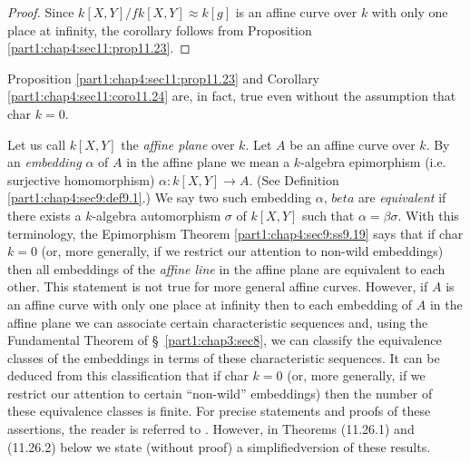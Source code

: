 \begin{proof}
  Since $k[X, Y]/fk [X, Y] \approx k[g]$ is an affine curve over $k$
  with only one place at infinity, the corollary follows from
  Proposition \ref{part1:chap4:sec11:prop11.23}.
\end{proof}

\begin{remark}\label{part1:chap4:sec11:rem11.25}
  Proposition \ref{part1:chap4:sec11:prop11.23} and
  Corollary \ref{part1:chap4:sec11:coro11.24} are, in fact, true even
  without the assumption that char $k=0$.
\end{remark}

\begin{remark}\label{part1:chap4:sec11:rem11.26}
  Let us call $k[X, Y]$ the {\em affine plane} over $k$. Let $A$ be an
  affine curve over $k$. By an {\em embedding} $\alpha$ of $A$ in the
  affine plane we mean a $k$-algebra epimorphism (i.e. surjective
  homomorphism) $\alpha : k[X, Y]\to A$. (See Definition
  \ref{part1:chap4:sec9:def9.1}.) We say two such embedding $\alpha$,
  $beta$ are {\em equivalent} if there exists a $k$-algebra
  automorphism $\sigma$ of $k[X, Y]$ such that $\alpha= \beta
  \sigma$. With this terminology, the Epimorphism Theorem
  \ref{part1:chap4:sec9:ss9.19} says that if char $k=0$ (or, more
  generally, if we restrict our attention to non-wild embeddings) then
  all embeddings of the {\em affine line} in the affine plane are
  equivalent to each other. This statement is not true for more
  general affine curves. However, if $A$ is an affine curve with only
  one place at infinity then to each embedding of $A$ in the affine
  plane we can associate certain characteristic sequences and, using
  the Fundamental Theorem of \S\ \ref{part1:chap3:sec8}, we can
  classify the equivalence classes of the embeddings in terms of these
  characteristic sequences. It can be deduced from this classification
  that if char $k=0$ (or, more generally, if we restrict our attention
  to certain ``non-wild'' embeddings) then the number of these
  equivalence classes is finite. For precise statements and proofs of
  these assertions, the reader is referred to \cite{3}. However, in
  Theorems  (11.26.1) and
  (11.26.2) below we state (without proof) a
  simplified\pageoriginale version of these results.
\end{remark}

